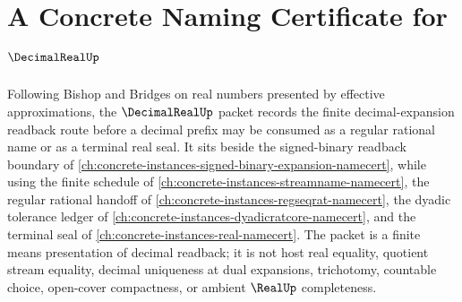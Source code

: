 \chapter{A Concrete Naming Certificate for $\DecimalRealUp$}
\label{ch:concrete-instances-decimal-real-namecert}

Following Bishop and Bridges on real numbers presented by effective approximations, the $\DecimalRealUp$ packet records the finite decimal-expansion readback route before a decimal prefix may be consumed as a regular rational name or as a terminal real seal. It sits beside the signed-binary readback boundary of \autoref{ch:concrete-instances-signed-binary-expansion-namecert}, while using the finite schedule of \autoref{ch:concrete-instances-streamname-namecert}, the regular rational handoff of \autoref{ch:concrete-instances-regseqrat-namecert}, the dyadic tolerance ledger of \autoref{ch:concrete-instances-dyadicratcore-namecert}, and the terminal seal of \autoref{ch:concrete-instances-real-namecert}. The packet is a finite means presentation of decimal readback; it is not host real equality, quotient stream equality, decimal uniqueness at dual expansions, trichotomy, countable choice, open-cover compactness, or ambient $\RealUp$ completeness.


